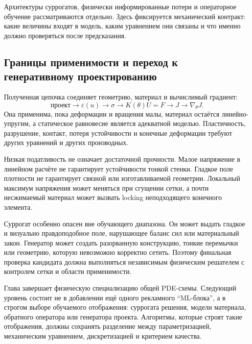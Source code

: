 Архитектуры суррогатов, физически информированные потери и операторное обучение рассматриваются отдельно. Здесь фиксируется механический контракт: какие величины входят в модель, каким уравнением они связаны и что именно должно проверяться после предсказания.

\subsection{Границы применимости и переход к генеративному проектированию}

Полученная цепочка соединяет геометрию, материал и вычислимый градиент:
\[
 \text{проект}
 \longrightarrow
 \varepsilon(u)
 \longrightarrow
 \sigma
 \longrightarrow
 K(\theta)U=F
 \longrightarrow
 J
 \longrightarrow
 \nabla_\theta J.
\]
Она применима, пока деформации и вращения малы, материал остаётся линейно-упругим, а статическое равновесие является адекватной моделью. Пластичность, разрушение, контакт, потеря устойчивости и конечные деформации требуют других уравнений и других производных.

Низкая податливость не означает достаточной прочности. Малое напряжение в линейном расчёте не гарантирует устойчивости тонкой стенки. Гладкое поле плотности не гарантирует связной или изготавливаемой геометрии. Локальный максимум напряжения может меняться при сгущении сетки, а почти несжимаемый материал может вызвать locking неподходящего конечного элемента.

Суррогат особенно опасен вне обучающего диапазона. Он может выдать гладкое и визуально правдоподобное поле, нарушающее баланс сил или материальный закон. Генератор может создать разорванную конструкцию, тонкие перемычки или геометрию, которую невозможно корректно сетить. Поэтому финальная проверка кандидата должна выполняться независимым физическим решателем с контролем сетки и области применимости.

Глава завершает физическую специализацию общей PDE-схемы. Следующий уровень состоит не в добавлении ещё одного рекламного ``ML-блока'', а в строгом выборе обучаемого отображения: суррогата решения, модели материала, обратного оператора или генератора проекта. Алгоритмы, которые строят такие отображения, должны сохранять разделение между параметризацией, механическим уравнением, дискретизацией и критерием качества.
